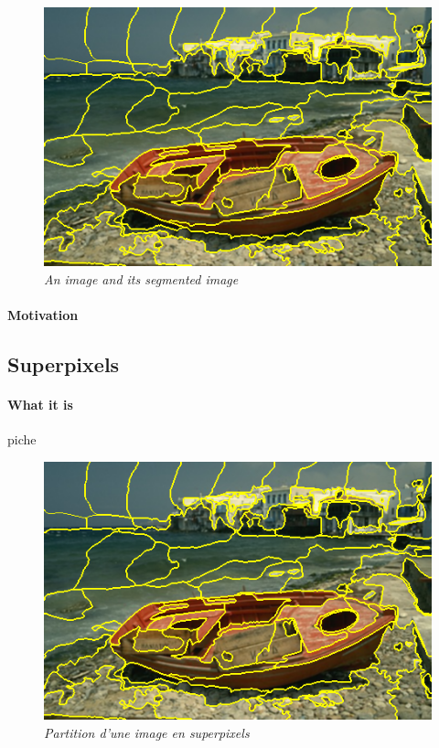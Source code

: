 \documentclass{article}
\begin{document}
            \begin{figure}[!htb]
                \centering
                \includegraphics[scale=0.5]{pics/img.png}
                \caption{\textit{An image and its segmented image}}
                \label{fig:segm}
            \end{figure}
            \paragraph{Motivation}

    \subsection{Superpixels}
            \paragraph{What it is}piche

            \begin{figure}[!htb]
                \centering
                \includegraphics[scale=0.5]{pics/img.png}
                \caption{\textit{Partition d'une image en superpixels}}
                \label{fig:spp}
            \end{figure}
\end{document}
